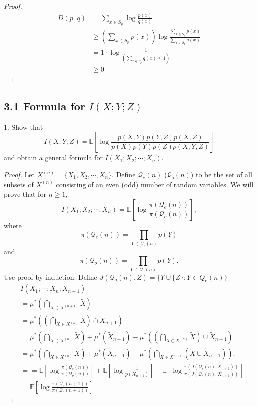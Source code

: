 \documentclass[../main.tex]{subfiles}
\begin{document}
    \begin{proof}
        \begin{align*}
        D(p||q) &=\sum_{x\in S_p}\log\frac{p(x)}{q(x)}\\
        &\geq (\sum_{x\in S_p}p(x))\log\frac{\sum_{x\in S_p}p(x)}{\sum_{x\in S_p}q(x)}\\
        &= 1\cdot\log\frac{1}{(\sum_{x\in S_p}q(x)\leq 1)}\\
        &\geq 0
        \end{align*}
    \end{proof}
\subsection*{3.1 Formula for $I(X;Y;Z)$}
1. Show that
\[
I(X; Y; Z) = \mathbb{E} \left[ \log \frac{p(X, Y)p(Y, Z)p(X, Z)}{p(X)p(Y)p(Z)p(X, Y, Z)} \right]
\]
and obtain a general formula for \(I(X_1; X_2; \cdots; X_n)\).

\begin{proof}
Let \(X^{(n)} = \{X_1, X_2, \cdots, X_n\}\). Define \(\mathcal{Q}_e(n)\) (\(\mathcal{Q}_o(n)\)) to be the set of all subsets of \(X^{(n)}\) consisting of an even (odd) number of random variables. 
We will prove that for \(n \geq 1\),
\[
I(X_1; X_2; \cdots; X_n) = \mathbb{E} \left[ \log \frac{\pi(\mathcal{Q}_e(n))}{\pi(\mathcal{Q}_o(n))} \right], \tag{A3.1}
\]
where
\[
\pi(\mathcal{Q}_e(n)) = \prod_{Y \in \mathcal{Q}_e(n)} p(Y)
\]
and
\[
\pi(\mathcal{Q}_o(n)) = \prod_{Y \in \mathcal{Q}_o(n)} p(Y).
\]
Use proof by induction:
Define \( J(\mathcal{Q}_o(n), Z) =\{Y\cup \{Z\}:Y\in Q_e(n)\}  \)\\
\begin{align*}
&I(X_1; \cdots; X_n; X_{n+1})\\
&= \mu^*\left( \bigcap_{X \in X^{(n+1)}} \widetilde{X} \right)\\
&= \mu^*\left( \left( \bigcap_{X \in X^{(n)}} \widetilde{X} \right) \cap \widetilde{X}_{n+1} \right)\\
&= \mu^*\left( \bigcap_{X \in X^{(n)}} \widetilde{X} \right) + \mu^*(\widetilde{X}_{n+1}) - \mu^*\left( \left( \bigcap_{X \in X^{(n)}} \widetilde{X} \right) \cup \widetilde{X}_{n+1} \right)\\
&= \mu^*\left( \bigcap_{X \in X^{(n)}} \widetilde{X} \right) + \mu^*(\widetilde{X}_{n+1}) - \mu^*\left( \bigcap_{X \in X^{(n)}} (\widetilde{X} \cup \widetilde{X}_{n+1}) \right).\\
&== \mathbb{E} \left[ \log \frac{\pi(\mathcal{Q}_e(n))}{\pi(\mathcal{Q}_o(n))} \right] + \mathbb{E} \left[ \log \frac{1}{p(X_{n+1})} \right] - \mathbb{E} \left[ \log \frac{\pi(J(\mathcal{Q}_e(n), X_{n+1}))}{\pi(J(\mathcal{Q}_o(n), X_{n+1}))} \right]
\\
&=\mathbb{E} \left[ \log \frac{\pi(\mathcal{Q}_e(n+1))}{\pi(\mathcal{Q}_o(n+1))} \right]
\end{align*}
\end{proof}
\end{document}
